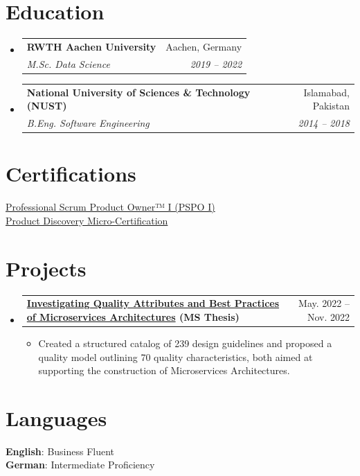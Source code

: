 \documentclass[letterpaper,10.5pt]{article}
\makeatletter
\newcommand{\resumeItem}[1]{
  \item\small{
    {#1 \vspace{-2pt}}
  }
}
\newcommand{\resumeSubheading}[4]{
  \vspace{-2pt}\item
    \begin{tabular*}{0.97\textwidth}[t]{l@{\extracolsep{\fill}}r}
      \textbf{#1} & #2 \\
      \textit{\small#3} & \textit{\small #4} \\
    \end{tabular*}\vspace{-2pt}
}
\newcommand{\resumeProjectHeading}[2]{
    \item
    \begin{tabular*}{0.97\textwidth}{l@{\extracolsep{\fill}}r}
      \small#1 & #2 \\
    \end{tabular*}\vspace{-7pt}
}
\newcommand{\resumeSubHeadingListStart}{\begin{itemize}[leftmargin=0.15in, label={}]}
\newcommand{\resumeSubHeadingListEnd}{\end{itemize}}
\newcommand{\resumeItemListStart}{\begin{itemize}}
\newcommand{\resumeItemListEnd}{\end{itemize}\vspace{-5pt}}
\makeatother
\begin{document}
\section{Education}
  \resumeSubHeadingListStart
    \resumeSubheading
      {RWTH Aachen University}{Aachen, Germany}
      {M.Sc. Data Science} {2019 -- 2022}
    \resumeSubheading
      {National University of Sciences \& Technology (NUST)}{Islamabad, Pakistan}
      {B.Eng. Software Engineering} {2014 -- 2018}
  \resumeSubHeadingListEnd


 \vspace{2pt}
 \section{Certifications}
\begin{itemize}[leftmargin=0.15in, label={}]
    \small{\item{
    \href{https://www.credly.com/badges/32469ad6-cd7a-4af1-80e6-e3a7f364c4f6/linked_in_profile}{Professional Scrum Product Owner™ I (PSPO I)}{}\\

    \href{https://faizanzafar.de/product-discovery-micro-certification-pdc.pdf}{Product Discovery Micro-Certification}{} \\
    
    }}
 \end{itemize}

 
 \vspace{2pt}
 \section{Projects}
        \resumeSubHeadingListStart
      \resumeProjectHeading
          {\textbf{\href{https://faizanzafar.de/msa/}{Investigating Quality Attributes and Best Practices of Microservices Architectures} \small{(MS Thesis)}}\emph{}}{May. 2022  -- Nov. 2022}
          \resumeItemListStart
            \resumeItem{Created a structured catalog of 239 design guidelines and proposed a quality model outlining 70 quality characteristics, both aimed at supporting the construction of Microservices Architectures.}
          \resumeItemListEnd
    \resumeSubHeadingListEnd

 
\vspace{2pt}
\section{Languages}
 \begin{itemize}[leftmargin=0.15in, label={}]
    \small{\item{
     \textbf{English}{: \hspace{0.80cm} Business Fluent} \\
     \textbf{German}{: \hspace{0.68cm} Intermediate Proficiency} \\
    }}
 \end{itemize}

\end{document}
